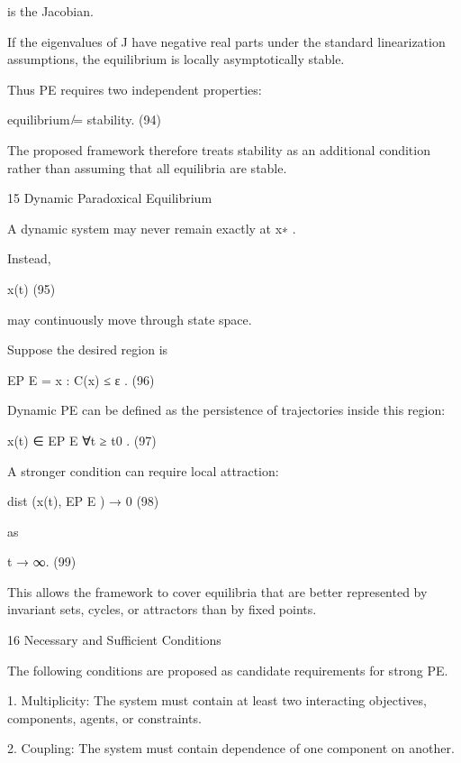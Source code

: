 \documentclass[10pt,a4paper]{article}
\begin{document}
\begin{ManuscriptText}
is the Jacobian.

If the eigenvalues of J have negative real parts under the standard linearization assumptions,
the equilibrium is locally asymptotically stable.

Thus PE requires two independent properties:


                                     equilibrium ̸= stability.                                (94)

The proposed framework therefore treats stability as an additional condition rather than assuming
that all equilibria are stable.


15       Dynamic Paradoxical Equilibrium

A dynamic system may never remain exactly at x∗ .

Instead,


                                                 x(t)                                          (95)

may continuously move through state space.

Suppose the desired region is


                                       EP E = {x : C(x) ≤ ε} .                                 (96)

Dynamic PE can be defined as the persistence of trajectories inside this region:


                                        x(t) ∈ EP E     ∀t ≥ t0 .                              (97)

A stronger condition can require local attraction:


                                        dist (x(t), EP E ) → 0                                 (98)

as


                                               t → ∞.                                          (99)

This allows the framework to cover equilibria that are better represented by invariant sets, cycles,
or attractors than by fixed points.


16       Necessary and Sufficient Conditions

The following conditions are proposed as candidate requirements for strong PE.


     1. Multiplicity: The system must contain at least two interacting objectives, components,
       agents, or constraints.

     2. Coupling: The system must contain dependence of one component on another.


\end{ManuscriptText}
\end{document}
